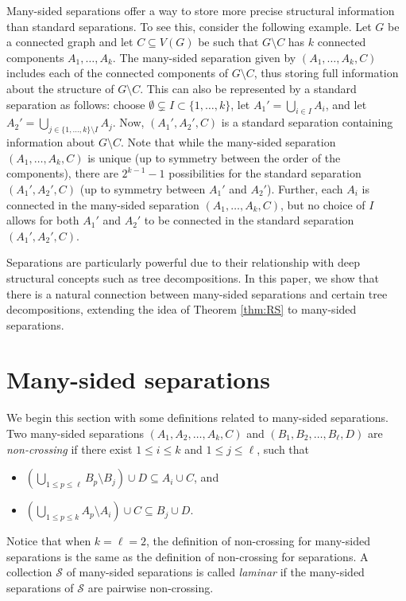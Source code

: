 \documentclass[12pt]{amsart}
\renewcommand{\S}{\mathcal{S}}
\begin{document}
Many-sided separations offer a way to store more precise structural information than standard separations. To see this, consider the following example. Let $G$ be a connected graph and let $C \subseteq V(G)$ be such that $G \setminus C$ has $k$ connected components $A_1, \hdots, A_k$. The many-sided separation given by $(A_1, \hdots, A_k, C)$ includes each of the connected components of $G \setminus C$, thus storing full information about the structure of $G \setminus C$. This can also be represented by a standard separation as follows: choose $\emptyset \subsetneq I \subset \{1, \hdots, k\}$, let $A_1' = \bigcup_{i \in I} A_i$, and let $A_2' = \bigcup_{j \in \{1, \hdots, k\} \setminus I} A_j$. Now, $(A_1', A_2', C)$ is a standard separation containing information about $G \setminus C$. Note that while the many-sided separation $(A_1, \hdots, A_k, C)$ is unique (up to symmetry between the order of the components), there are $2^{k-1} - 1$ possibilities for the standard separation $(A_1', A_2', C)$ (up to symmetry between $A_1'$ and $A_2'$). Further, each $A_i$ is connected in the many-sided separation $(A_1, \hdots, A_k, C)$, but no choice of $I$ allows for both $A_1'$ and $A_2'$ to be connected in the standard separation $(A_1', A_2', C)$.

Separations are particularly powerful due to their relationship with deep structural concepts such as tree decompositions. In this paper, we show that there is a natural connection between many-sided separations and certain tree decompositions, extending the idea of Theorem \ref{thm:RS} to many-sided separations.


\section{Many-sided separations}

We begin this section with some definitions related to many-sided separations. Two many-sided separations $(A_1, A_2, \hdots, A_k, C)$ and $(B_1, B_2, \hdots, B_\ell, D)$ are {\em non-crossing} if there exist $1 \leq i \leq k$ and $1 \leq j \leq \ell$, such that
\begin{itemize}

\item $\left(\bigcup_{1 \leq p \leq \ell} B_p \setminus B_j\right) \cup D \subseteq A_i \cup C$, and
\item $\left(\bigcup_{1 \leq p \leq k} A_p \setminus A_i\right) \cup C \subseteq B_j \cup D$.
\end{itemize}
Notice that when $k = \ell = 2$, the definition of non-crossing for many-sided separations is the same as the definition of non-crossing for separations. A collection $\S$ of many-sided separations is called {\em laminar} if the many-sided separations of $\S$ are pairwise non-crossing.
\end{document}
